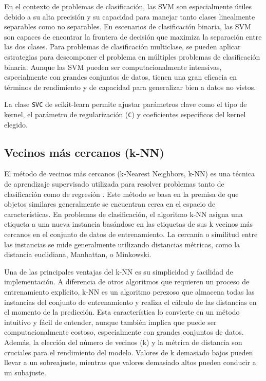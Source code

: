 En el contexto de problemas de clasificación, las SVM son especialmente útiles debido a su alta precisión y su capacidad para manejar tanto clases linealmente separables como no separables. En escenarios de clasificación binaria, las SVM son capaces de encontrar la frontera de decisión que maximiza la separación entre las dos clases. Para problemas de clasificación multiclase, se pueden aplicar estrategias para descomponer el problema en múltiples problemas de clasificación binaria. Aunque las SVM pueden ser computacionalmente intensivas, especialmente con grandes conjuntos de datos, tienen una gran eficacia en términos de rendimiento y de capacidad para generalizar bien a datos no vistos.

La clase \texttt{SVC} \cite{sk-svm} de scikit-learn permite ajustar parámetros clave como el tipo de kernel, el parámetro de regularización (\texttt{C}) y coeficientes específicos del kernel elegido.

\subsection{Vecinos más cercanos (k-NN)}
\label{subsec:model-neighbors}

El método de vecinos más cercanos (k-Nearest Neighbors, k-NN) es una técnica de aprendizaje supervisado utilizada para resolver problemas tanto de clasificación como de regresión \cite{james2023introduction}. Este método se basa en la premisa de que objetos similares generalmente se encuentran cerca en el espacio de características. En problemas de clasificación, el algoritmo k-NN asigna una etiqueta a una nueva instancia basándose en las etiquetas de sus k vecinos más cercanos en el conjunto de datos de entrenamiento. La cercanía o similitud entre las instancias se mide generalmente utilizando distancias métricas, como la distancia euclidiana, Manhattan, o Minkowski.

Una de las principales ventajas del k-NN es su simplicidad y facilidad de implementación. A diferencia de otros algoritmos que requieren un proceso de entrenamiento explícito, k-NN es un algoritmo perezoso que almacena todas las instancias del conjunto de entrenamiento y realiza el cálculo de las distancias en el momento de la predicción. Esta característica lo convierte en un método intuitivo y fácil de entender, aunque también implica que puede ser computacionalmente costoso, especialmente con grandes conjuntos de datos. Además, la elección del número de vecinos (k) y la métrica de distancia son cruciales para el rendimiento del modelo. Valores de k demasiado bajos pueden llevar a un sobreajuste, mientras que valores demasiado altos pueden conducir a un subajuste.

